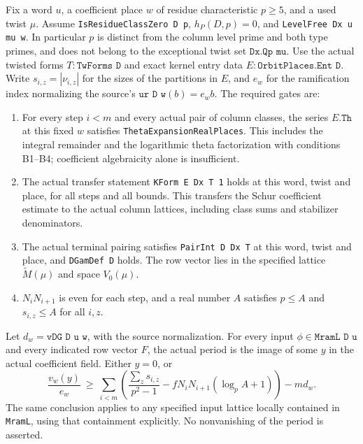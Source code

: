 Fix a word $u$, a coefficient place $w$ of residue characteristic
$p\ge5$, and a used twist $\mu$.  Assume
\texttt{IsResidueClassZero D p}, $h_P(D,p)=0$, and
\texttt{LevelFree Dx u mu w}.  In particular $p$ is distinct from the
column level prime and both type primes, and does not belong to the
exceptional twist set $\texttt{Dx.Qp mu}$.
Use the actual twisted forms $T:\texttt{TwForms D}$ and exact kernel
entry data $E:\texttt{OrbitPlaces.Ent D}$.  Write
$s_{i,z}=|\nu_{i,z}|$ for the sizes of the partitions in $E$, and
$e_w$ for the ramification index normalizing the source's
$\texttt{ur D w}(b)=e_wb$.  The required gates are:
\begin{enumerate}
\item For every step $i<m$ and every actual pair of column classes,
      the series $E.\texttt{Th}$ at this fixed $w$ satisfies
      \texttt{ThetaExpansionRealPlaces}.  This includes the integral
      remainder and the logarithmic theta factorization with conditions
      B1--B4; coefficient algebraicity alone is insufficient.
\item The actual transfer statement \texttt{KForm E Dx T 1} holds at
      this word, twist and place, for all steps and all bounds.  This
      transfers the Schur coefficient estimate to the actual column
      lattices, including class sums and stabilizer denominators.
\item The actual terminal pairing satisfies \texttt{PairInt D Dx T}
      at this word, twist and place, and \texttt{DGamDef D} holds.
      The row vector lies in the specified lattice
      $\widetilde M(\mu)$ and space $V_0(\mu)$.
\item $N_iN_{i+1}$ is even for each step, and a real number $A$ satisfies
      $p\le A$ and $s_{i,z}\le A$ for all $i,z$.
\end{enumerate}
Let $d_w=\texttt{vDG D u w}$, with the source normalization.
For every input $\phi\in\texttt{MramL D u}$ and every indicated row
vector $F$, the actual period is the image of some $y$ in the actual
coefficient field.  Either $y=0$, or
\begin{equation}\label{eq:SF08-pointwise}
 \frac{v_w(y)}{e_w}\ \ge\
 \sum_{i<m}\left(
   \frac{\sum_z s_{i,z}}{p^2-1}
       -fN_iN_{i+1}(\log_p A+1)\right)-m d_w.
\end{equation}
The same conclusion applies to any specified input lattice locally
contained in \texttt{MramL}, using that containment explicitly.
No nonvanishing of the period is asserted.

